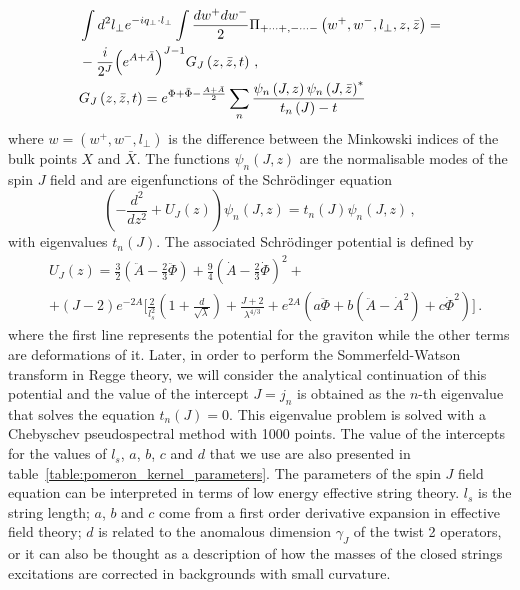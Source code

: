 \documentclass[preprint, 12pt]{elsarticle}
\begin{document}
\begin{align}
\label{eq:propagator_identity}
&\int d^2l_\perp e^{-i q_\perp \cdot l_\perp} \int \frac{dw^+ dw^-}{2} \Pi_{+\dots+, - \dots -}\left(w^+, w^-, l_\perp, z, \bar{z}\right) = \notag \\
&- \frac{i}{2^J} {\left( e ^{A+\bar{A}}\right)}^{J-1} G_J \left(z, \bar{z}, t\right) \, , \\
& G_J\left(z, \bar{z}, t\right) = e^{\Phi + \bar{\Phi} - \frac{A + \bar{A}}{2}} \sum_n \frac{\psi_n \left(J, z\right) {\psi_n \left(J, \bar{z}\right)}^*}{t_n \left(J\right) - t}
\end{align}
where $w = \left(w^+, w^-, l_\perp\right)$ is the difference between the Minkowski indices of the bulk points $X$ and $\bar{X}$.
The functions $\psi_n\left(J, z\right)$ are the normalisable modes of the spin $J$ field and are eigenfunctions of the Schr\"{o}dinger equation
\begin{equation}
  \left(-\frac{d^2}{dz^2}+U_J(z)\right)\psi_n(J,z)=t_n\left(J\right)\psi_n(J,z)\,,
\end{equation}
with eigenvalues $t_n \left(J\right)$. The associated Schr\"{o}dinger potential is defined by
\begin{align}
 & U_J(z)= \frac{3}{2}\left(\ddot A - \frac{2}{3}\ddot \Phi\right) + \frac{9}{4}{\left(\dot A - \frac{2}{3}\dot \Phi \right)}^2 + \\
 &+ (J - 2)e^{-2A}\bigg[\frac{2}{l^2_s}\left(1+\frac{d}{\sqrt{\lambda}}\right) + \frac{J + 2}{\lambda^{4/3}}+e^{2A} \left(a \ddot \Phi + b \left(\ddot A - \dot{A}^2\right) + c \dot{\Phi}^2  \right)\bigg]\,.
 \nonumber
\end{align}
where the first line represents the potential for the graviton while the other terms are deformations of it. Later, in order to perform the Sommerfeld-Watson transform in Regge theory, we will consider the analytical continuation of this potential and the value of the intercept $J = j_n$ is obtained as the  $n$-th  eigenvalue that solves the equation $t_n(J)=0$. This eigenvalue problem is solved with a Chebyschev pseudospectral method with 1000 points. The value of the intercepts for the values of $l_s$, $a$, $b$, $c$ and $d$ that we use are also presented in table~\ref{table:pomeron_kernel_parameters}. 
The parameters of the spin $J$ field equation can be interpreted in terms of low energy effective string theory. $l_s$ is the string length; $a$, $b$ and $c$ come from a first order derivative expansion in effective field theory; $d$ is related to the anomalous dimension $\gamma_J$ of the twist 2 operators, or it can also be thought as a description of how the masses of the closed strings excitations are corrected in backgrounds with small curvature.
\end{document}
